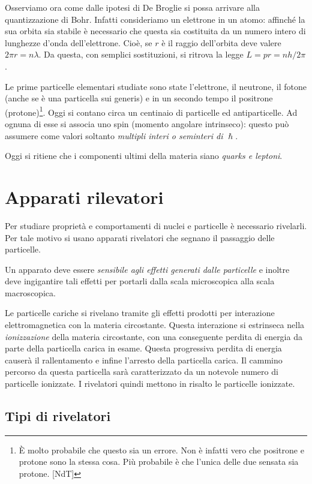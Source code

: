 Osserviamo ora come dalle ipotesi di De Broglie si possa arrivare alla 
quantizzazione di Bohr. Infatti consideriamo un elettrone in un atomo: 
affinché la sua orbita sia stabile è necessario che questa sia costituita da 
un numero intero di lunghezze d'onda dell'elettrone. Cioè, se $r$ è il raggio 
dell'orbita deve valere $2\pi r= n\lambda$. Da questa, con semplici 
sostituzioni, si ritrova la legge $L = pr = nh/2\pi$.

Le prime particelle elementari studiate sono state l'elettrone, il neutrone, il 
fotone (anche se è una particella sui generis) e in un secondo tempo il 
positrone (protone)\footnote{È molto probabile che questo sia un errore. Non 
è infatti vero che positrone e protone sono la stessa cosa. Più probabile è 
che l'unica delle due sensata sia protone. [NdT]}. Oggi si contano circa un 
centinaio di particelle ed antiparticelle. Ad ognuna di esse si associa uno 
spin (momento angolare intrinseco): questo può assumere come valori soltanto 
\textit{multipli interi o seminteri di $\hslash$}.

Oggi si ritiene che i componenti ultimi della materia siano \textit{quarks e 
leptoni}.

\chapter{Apparati rilevatori}
Per studiare proprietà e comportamenti di nuclei e
particelle è necessario rivelarli. Per tale motivo si usano apparati rivelatori
che segnano il passaggio delle particelle.

Un apparato deve essere \textit{sensibile agli effetti generati dalle
particelle} e inoltre deve ingigantire tali effetti per portarli dalla scala
microscopica alla scala macroscopica.

Le particelle cariche si rivelano tramite gli effetti prodotti per interazione
elettromagnetica con la materia circostante. Questa interazione si estrinseca
nella \textit{ionizzazione} della materia circostante, con una conseguente
perdita di energia da parte della particella carica in esame. Questa
progressiva perdita di energia causerà il rallentamento e infine l'arresto
della particella carica. Il cammino percorso da questa particella sarà
caratterizzato da un notevole numero di particelle ionizzate. I rivelatori
quindi mettono in risalto le particelle ionizzate.

\section{Tipi di rivelatori}

